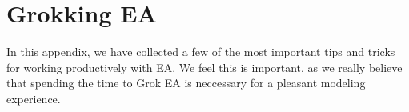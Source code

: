 \section{Grokking EA}

In this appendix, we have collected a few of the most important tips and tricks for working productively with EA.
We feel this is important, as we really believe that spending the time to Grok EA is neccessary for a pleasant modeling experience.


















